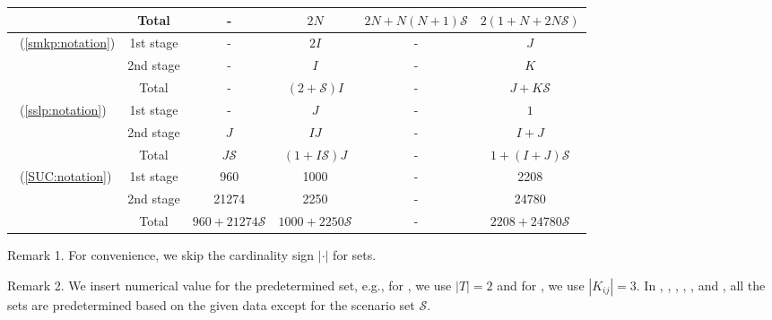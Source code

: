 \begin{table}[H]
{\begin{threeparttable}
\begin{tabular}{@{}lccccc@{}}
				& Total          & -              & $2N$                               & $2N+N(N+1)\mathcal{S}$ & $2(1+N+2N\mathcal{S})$    \\ \midrule
				\multirow{3}{*}{\smkp\ (\ref{smkp:notation})}   & 1st stage & -              & $2I$                               & -                    & $J$                       \\
				& 2nd stage & -              & $I$                                & -                    & $K$                       \\ \cmidrule(l){2-6} 
				& Total          & -              & $(2+\mathcal{S})I$                 & -                    & $J+K\mathcal{S}$          \\ \midrule
				\multirow{3}{*}{\sslp\ (\ref{sslp:notation})}   & 1st stage & -              & $J$                                & -                    & $1$                       \\
				& 2nd stage & $J$            & $IJ$                               & -                    & $I+J$                     \\ \cmidrule(l){2-6} 
				& Total          & $J\mathcal{S}$ & $(1+I\mathcal{S})J$                & -                    & $1+(I+J)\mathcal{S}$      \\ \midrule
				\multirow{3}{*}{\suc\ (\ref{SUC:notation})}   & 1st stage & 960               &   1000                                 &     -                 &  2208                         \\
				& 2nd stage & 21274               &     2250                               &   -                   & 24780                          \\ \cmidrule(l){2-6} 
				& Total          & $960+21274\mathcal{S}$                &  $1000+2250\mathcal{S}$                                  &  -                    &  $2208+24780\mathcal{S}$                         \\ \bottomrule
			\end{tabular}
			
			\begin{tablenotes}
				\small
				\item Remark 1. For convenience, we skip the cardinality sign $|\cdot|$ for sets.
				\item Remark 2. We insert numerical value for the predetermined set, e.g., for \sizes, we use $|T|=2$ and for \mptsps, we use $|K_{ij}|=3$. In \airlift, \cargo, \chem, \phone, \sdcp, and \suc, all the sets are predetermined based on the given data except for the scenario set $\mathcal{S}$.
			\end{tablenotes}
		\end{threeparttable}
	}
\end{table}


